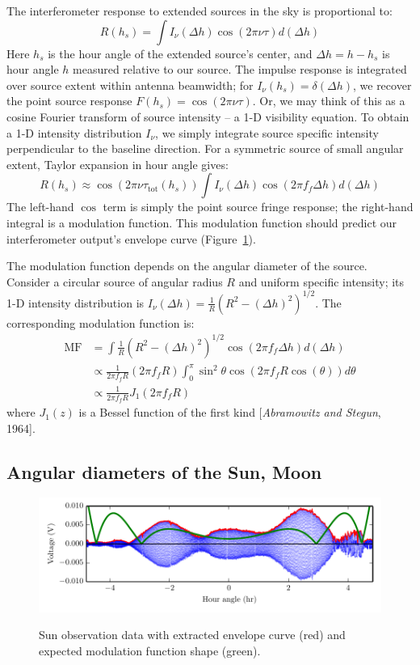 \documentclass[10pt]{article}
\begin{document}
The interferometer response to extended sources in the sky is proportional to:
\[
    R(h_s) = \int I_\nu (\Delta h) \cos(2\pi\nu \tau) d(\Delta h)
\]
Here $h_s$ is the hour angle of the extended source's center, and $\Delta h = h - h_s$ is hour angle $h$ measured relative to our source.  The impulse response is integrated over source extent within antenna beamwidth; for $I_\nu(h_s) = \delta(\Delta h)$, we recover the point source response $F(h_s) = \cos(2\pi\nu \tau)$.  Or, we may think of this as a cosine Fourier transform of source intensity -- a 1-D visibility equation.  To obtain a 1-D intensity distribution $I_\nu$, we simply integrate source specific intensity perpendicular to the baseline direction.  For a symmetric source of small angular extent, Taylor expansion in hour angle gives:
\[
    R(h_s) \approx \cos(2\pi\nu \tau_{\mathrm{tot}}(h_s)) \int I_\nu (\Delta h) \cos(2\pi f_f \Delta h) d(\Delta h)
\]
The left-hand $\cos$ term is simply the point source fringe response; the right-hand integral is a modulation function.  This modulation function should predict our interferometer output's envelope curve (Figure~\ref{fig:sunFringes}).

The modulation function depends on the angular diameter of the source.  Consider a circular source of angular radius $R$ and uniform specific intensity; its 1-D intensity distribution is $I_\nu(\Delta h) = \frac{1}{R} \left( R^2 - (\Delta h)^2 \right)^{1/2}$.  The corresponding modulation function is:
\begin{align*}
    \mathrm{MF} &= \int \frac{1}{R} \left( R^2 - (\Delta h)^2 \right)^{1/2} \cos(2\pi f_f \Delta h) d(\Delta h) \\
                &\propto \frac{1}{2\pi f_f R} \left(2\pi f_f R\right)
                         \int_0^\pi \sin^2 \theta \cos\left(2\pi f_f R \cos(\theta)\right) d\theta \\
                &\propto \frac{1}{2\pi f_f R} J_1 \left(2\pi f_f R \right)
\end{align*}
where $J_1(z)$ is a Bessel function of the first kind [\textit{Abramowitz and Stegun}, 1964].

\subsection{Angular diameters of the Sun, Moon}

\begin{figure}[!ht]
    \centering
    \includegraphics[scale=1]{plots_fitting/sun_fringes_envelopes.pdf} \\
    \caption{Sun observation data with extracted envelope curve (red) and expected modulation function shape (green).}
	\label{fig:sunFringes}
\end{figure}
\end{document}
